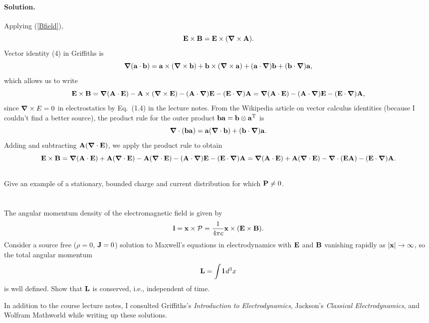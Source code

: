 \documentclass[11pt]{article}
\newcommand{\refeq}[1]{(\ref{#1})}
\newcommand{\beq}{\begin{equation*}}
\newcommand{\eeq}{\end{equation*}}
\newcommand{\beqn}{\begin{equation}}
\newcommand{\eeqn}{\end{equation}}
\newenvironment{statement}[1]
{
	\section{#1}
	\color{darkgray}
	\ignorespaces
}
{
}
\newenvironment{problem}
{
	\subsection{}
	\color{darkgray}
    \ignorespaces
}
{

}
\newenvironment{solution}
{
    \paragraph{Solution.}
    \ignorespaces
}
{
    \bigskip
}
\begin{document}
\begin{solution}
	Applying \refeq{Bfield},
	\beq
		\vE \times \vB = \vE \times (\grad \times \vA).
	\eeq
	Vector identity (4) in Griffiths is
	\beq
		\grad(\vaa \cdot \vbb) = \vaa \times (\grad \times \vbb) + \vbb \times (\grad \times \vaa) + (\vaa \cdot \grad) \vbb + (\vbb \cdot \grad) \vaa,
	\eeq
	which allows us to write
	\beq
		\vE \times \vB = \grad(\vA \cdot \vE) - \vA \times (\grad \times \vE) - (\vA \cdot \grad) \vE - (\vE \cdot \grad) \vA \notag
		= \grad(\vA \cdot \vE) - (\vA \cdot \grad) \vE - (\vE \cdot \grad) \vA,
	\eeq
	since $\grad \times E = 0$ in electrostatics by Eq.~(1.4) in the lecture notes.  From the Wikipedia article on vector calculus identities (because I couldn't find a better source), the product rule for the outer product $\vb{b} \vb{a} = \vb{b} \otimes \vb{a}^\text{T}$ is
	\beq
		\grad \cdot (\vbb \vaa) = \vaa (\grad \cdot \vbb) + (\vbb \cdot \grad) \vaa.
	\eeq
	Adding and subtracting $\vb{A} (\grad \cdot \vb{E})$, we apply the product rule to obtain
	\beq
		\vE \times \vB = \grad(\vA \cdot \vE) + \vA (\grad \cdot \vE) - \vA (\grad \cdot \vE) - (\vA \cdot \grad) \vE - (\vE \cdot \grad) \vA \notag \\
		= \grad(\vA \cdot \vE) + \vA (\grad \cdot \vE) - \grad \cdot (\vE \vA) - (\vE \cdot \grad) \vA. \label{thing2}
	\eeq
\end{solution}

\begin{problem}
	Give an example of a stationary, bounded charge and current distribution for which $\vb{P} \neq 0$.
\end{problem}



\newcommand{\vl}{\vb{l}}
\newcommand{\vL}{\vb{L}}

\begin{statement}{}
	The angular momentum density of the electromagnetic field is given by
	\beq
		\vl = \vx \times \vcP
		= \frac{1}{4\pi c} \vx \times (\vE \times \vB).
	\eeq
	Consider a source free ($\rho = 0$, $\vb{J} = 0$) solution to Maxwell's equations in electrodynamics with $\vb{E}$ and $\vb{B}$ vanishing rapidly as $\abs{\vb{x}} \to \infty$, so the total angular momentum
	\beq
		\vL = \int \vl \dcx
	\eeq
	is well defined.  Show that $\vL$ is conserved, i.e., independent of time.
\end{statement}



\vfill
In addition to the course lecture notes, I consulted Griffiths's \emph{Introduction to Electrodynamics}, Jackson's \emph{Classical Electrodynamics}, and Wolfram Mathworld while writing up these solutions.
\end{document}
